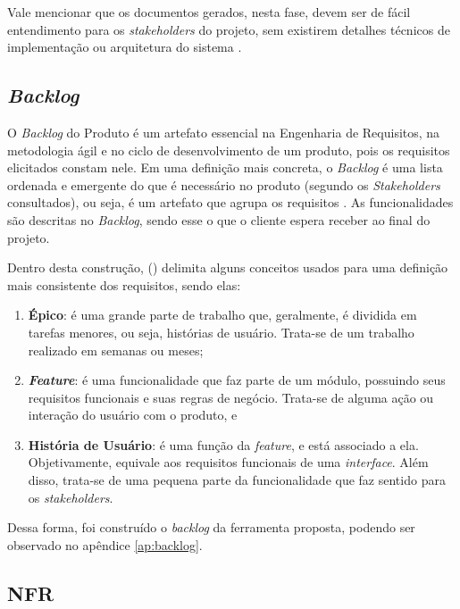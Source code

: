 Vale mencionar que os documentos gerados, nesta fase, devem ser de fácil entendimento para os \textit{stakeholders} do projeto, sem existirem detalhes técnicos de implementação ou arquitetura do sistema \cite{Sommerville10}.

\subsection{\textit{Backlog}}

\label{sec:backlog}

O \textit{Backlog} do Produto é um artefato essencial na Engenharia de Requisitos, na metodologia ágil e no ciclo de desenvolvimento de um produto, pois os requisitos elicitados constam nele. Em uma definição mais concreta, o \textit{Backlog} é uma lista ordenada e emergente do que é necessário no produto (segundo os \textit{Stakeholders} consultados), ou seja, é um artefato que agrupa os requisitos \cite{carolipaulo2021}. As funcionalidades são descritas no \textit{Backlog}, sendo esse o que o cliente espera receber ao final do projeto.

Dentro desta construção,  (\citeyear{carolipaulo2021}) delimita alguns conceitos usados para uma definição mais consistente dos requisitos, sendo elas:

\begin{enumerate}
    \item \label{tp:epico} \textbf{Épico}: é uma grande parte de trabalho que, geralmente, é dividida em tarefas menores, ou seja, histórias de usuário. Trata-se de um trabalho realizado em semanas ou meses;
    \item \label{tp:feature} \textit{\textbf{Feature}}: é uma funcionalidade que faz parte de um módulo, possuindo seus requisitos funcionais e suas regras de negócio. Trata-se de alguma ação ou interação do usuário com o produto, e
    \item \label{tp:us} \textbf{História de Usuário}: é uma função da \textit{feature}, e está associado a ela. Objetivamente, equivale aos requisitos funcionais de uma \textit{interface}. Além disso, trata-se de uma pequena parte da funcionalidade que faz sentido para os \textit{stakeholders}.
\end{enumerate}

Dessa forma, foi construído o \textit{backlog} da ferramenta proposta, podendo ser observado no apêndice \ref{ap:backlog}.

\subsection{NFR}

